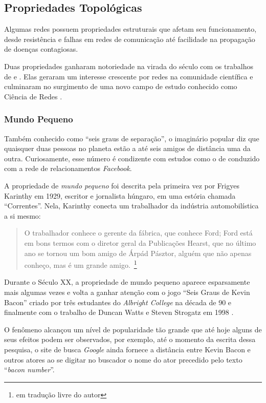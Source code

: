 \documentclass[12pt,a4paper,final]{article}
\begin{document}
\subsection{Propriedades Topológicas}

Algumas redes possuem propriedades estruturais que afetam seu funcionamento, desde resistência e falhas em redes de comunicação até facilidade na propagação de doenças contagiosas.

Duas propriedades ganharam notoriedade na virada do século com os trabalhos de  e . Elas geraram um interesse crescente por redes na comunidade científica e culminaram no surgimento de uma novo campo de estudo conhecido como Ciência de Redes \cite{Barabasi2016-rn}.

\subsubsection{Mundo Pequeno} \label{sec:small-world}

Também conhecido como \enquote{seis graus de separação}, o imaginário popular diz que quaisquer duas pessoas no planeta estão a até seis amigos de distância uma da outra. Curiosamente, esse número é condizente com estudos como o de  conduzido com a rede de relacionamentos \textit{Facebook}.

A propriedade de \textit{mundo pequeno} foi descrita pela primeira vez por Frigyes Karinthy em 1929, escritor e jornalista húngaro, em uma estória chamada \enquote{Correntes}. Nela, Karinthy conecta um trabalhador da indústria automobilística a si mesmo:

\blockcquote{Karinthy1929-jg}{O trabalhador conhece o gerente da fábrica, que conhece Ford; Ford está em bons termos com o diretor geral da Publicações Hearst, que no último ano se tornou um bom amigo de Árpád Pásztor, alguém que não apenas conheço, mas é um grande amigo.~\footnote{em tradução livre do autor}}

Durante o Século XX, a propriedade de mundo pequeno aparece esparsamente mais algumas vezes e volta a ganhar atenção com o jogo \enquote{Seis Graus de Kevin Bacon} criado por três estudantes do \textit{Albright College} na década de 90 e finalmente com o trabalho de Duncan Watts e Steven Strogatz em 1998 \cite{Barabasi2016-rn}.

O fenômeno alcançou um nível de popularidade tão grande que até hoje alguns de seus efeitos podem ser observados, por exemplo, até o momento da escrita dessa pesquisa, o site de busca \textit{Google} ainda fornece a distância entre Kevin Bacon e outros atores ao se digitar no buscador o nome do ator precedido pelo texto \enquote{\textit{bacon number}}.
\end{document}
